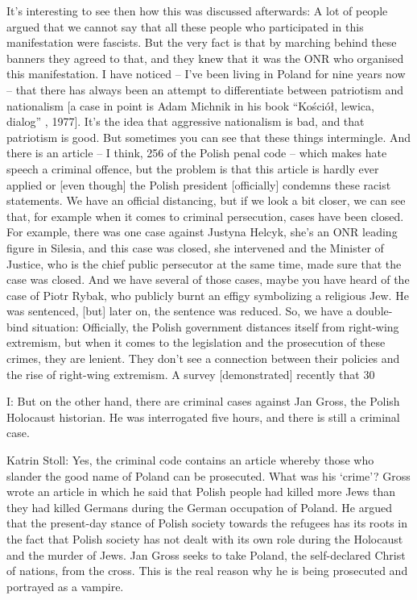 It’s interesting to see then how this was discussed afterwards: A lot of people argued that we cannot say that all these people who participated in this manifestation were fascists. But the very fact is that by marching behind these banners they agreed to that, and they knew that it was the ONR who organised this manifestation. I have noticed – I’ve been living in Poland for nine years now – that there has always been an attempt to differentiate between patriotism and nationalism [a case in point is Adam Michnik in his book “Kościół, lewica, dialog” , 1977]. It’s the idea that aggressive nationalism is bad, and that patriotism is good. But sometimes you can see that these things intermingle. And there is an article – I think, 256 of the Polish penal code – which makes hate speech a criminal offence, but the problem is that this article is hardly ever applied or [even though] the Polish president [officially] condemns these racist statements. We have an official distancing, but if we look a bit closer, we can see that, for example when it comes to criminal persecution, cases have been closed. For example, there was one case against Justyna Helcyk, she’s an ONR leading figure in Silesia, and this case was closed, she intervened and the Minister of Justice, who is the chief public persecutor at the same time, made sure that the case was closed. And we have several of those cases, maybe you have heard of the case of Piotr Rybak, who publicly burnt an effigy symbolizing a religious Jew. He was sentenced, [but] later on, the sentence was reduced. So, we have a double-bind situation: Officially, the Polish government distances itself from right-wing extremism, but when it comes to the legislation and the prosecution of these crimes, they are lenient. They don’t see a connection between their policies and the rise of right-wing extremism. A survey [demonstrated] recently that 30%

 

I: But on the other hand, there are criminal cases against Jan Gross, the Polish Holocaust historian. He was interrogated five hours, and there is still a criminal case. 

 

Katrin Stoll: Yes, the criminal code contains an article whereby those who slander the good name of Poland can be prosecuted. What was his ‘crime’? Gross wrote an article in which he said that Polish people had killed more Jews than they had killed Germans during the German occupation of Poland. He argued that the present-day stance of Polish society towards the refugees has its roots in the fact that Polish society has not dealt with its own role during the Holocaust and the murder of Jews. Jan Gross seeks to take Poland, the self-declared Christ of nations, from the cross. This is the real reason why he is being prosecuted and portrayed as a vampire.  

